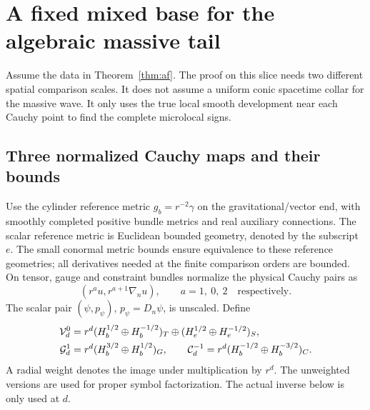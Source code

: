 \section{A fixed mixed base for the algebraic massive tail}\label{sec:af}

Assume the data in Theorem~\ref{thm:af}. The proof on this slice needs two different spatial comparison scales. It does not assume a uniform conic spacetime collar for the massive wave. It only uses the true local smooth development near each Cauchy point to find the complete microlocal signs.

\subsection{Three normalized Cauchy maps and their bounds}\label{sec:maps}

Use the cylinder reference metric \(g_b=r^{-2}\gamma\) on the gravitational/vector end, with smoothly completed positive bundle metrics and real auxiliary connections. The scalar reference metric is Euclidean bounded geometry, denoted by the subscript \(e\). The small conormal metric bounds ensure equivalence to these reference geometries; all derivatives needed at the finite comparison orders are bounded. On tensor, gauge and constraint bundles normalize the physical Cauchy pairs as
\[
  (r^a u,r^{a+1}\nabla_n u),\qquad
  a=1,\ 0,\ 2 \quad\text{respectively}.
\]
The scalar pair \((\psi,p_\psi)\), \(p_\psi=D_n\psi\), is unscaled. Define
\begin{align}
 \mathcal V_d^0&=r^d(H_b^{1/2}\oplus H_b^{-1/2})_T
          \oplus (H_e^{1/2}\oplus H_e^{-1/2})_S,\nonumber\\
 \mathcal G_d^1&=r^d(H_b^{3/2}\oplus H_b^{1/2})_G,\qquad
 \mathcal C_d^{-1}=r^d(H_b^{-1/2}\oplus H_b^{-3/2})_C .
 \label{eq:bases}
\end{align}
A radial weight denotes the image under multiplication by \(r^d\). The unweighted versions are used for proper symbol factorization. The actual inverse below is only used at \(d\).

